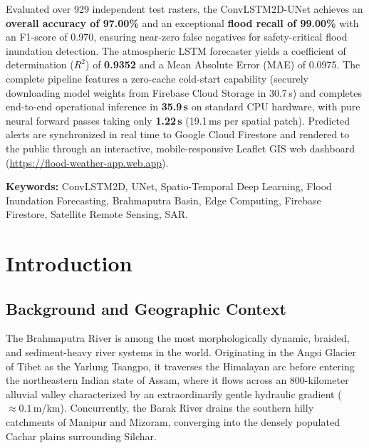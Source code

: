 \documentclass[12pt,a4paper,oneside]{report}
\begin{document}
Evaluated over 929 independent test rasters, the ConvLSTM2D-UNet achieves an \textbf{overall accuracy of 97.00\%} and an exceptional \textbf{flood recall of 99.00\%} with an F1-score of 0.970, ensuring near-zero false negatives for safety-critical flood inundation detection. The atmospheric LSTM forecaster yields a coefficient of determination ($R^2$) of \textbf{0.9352} and a Mean Absolute Error (MAE) of 0.0975. The complete pipeline features a zero-cache cold-start capability (securely downloading model weights from Firebase Cloud Storage in 30.7\,s) and completes end-to-end operational inference in \textbf{35.9\,s} on standard CPU hardware, with pure neural forward passes taking only \textbf{1.22\,s} (19.1\,ms per spatial patch). Predicted alerts are synchronized in real time to Google Cloud Firestore and rendered to the public through an interactive, mobile-responsive Leaflet GIS web dashboard (\url{https://flood-weather-app.web.app}).

\vspace{0.8cm}
\noindent
\textbf{Keywords:} ConvLSTM2D, UNet, Spatio-Temporal Deep Learning, Flood Inundation Forecasting, Brahmaputra Basin, Edge Computing, Firebase Firestore, Satellite Remote Sensing, SAR.

\newpage
\tableofcontents
\newpage
\listoffigures
\newpage
\listoftables

\newpage
{}
\setcounter{page}{1}

\chapter{Introduction}
\label{chap:intro}

\section{Background and Geographic Context}
The Brahmaputra River is among the most morphologically dynamic, braided, and sediment-heavy river systems in the world. Originating in the Angsi Glacier of Tibet as the Yarlung Tsangpo, it traverses the Himalayan arc before entering the northeastern Indian state of Assam, where it flows across an 800-kilometer alluvial valley characterized by an extraordinarily gentle hydraulic gradient ($\approx 0.1$\,m/km). Concurrently, the Barak River drains the southern hilly catchments of Manipur and Mizoram, converging into the densely populated Cachar plains surrounding Silchar.
\end{document}
